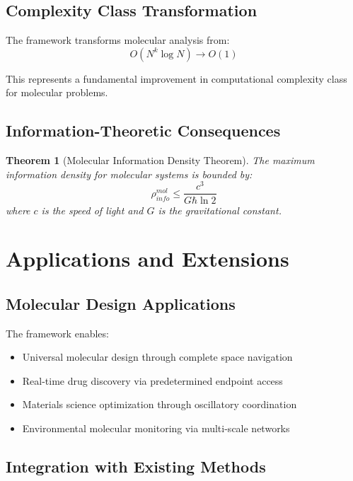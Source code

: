\documentclass[12pt,a4paper]{article}
\newtheorem{theorem}{Theorem}[section]
\begin{document}
\subsection{Complexity Class Transformation}

The framework transforms molecular analysis from:
\begin{equation}
O(N^k \log N) \rightarrow O(1)
\end{equation}

This represents a fundamental improvement in computational complexity class for molecular problems.

\subsection{Information-Theoretic Consequences}

\begin{theorem}[Molecular Information Density Theorem]
The maximum information density for molecular systems is bounded by:
\begin{equation}
\rho_{info}^{mol} \leq \frac{c^3}{G \hbar \ln 2}
\end{equation}
where $c$ is the speed of light and $G$ is the gravitational constant.
\end{theorem}

\section{Applications and Extensions}

\subsection{Molecular Design Applications}

The framework enables:
\begin{itemize}
\item Universal molecular design through complete space navigation
\item Real-time drug discovery via predetermined endpoint access
\item Materials science optimization through oscillatory coordination
\item Environmental molecular monitoring via multi-scale networks
\end{itemize}

\subsection{Integration with Existing Methods}
\end{document}
